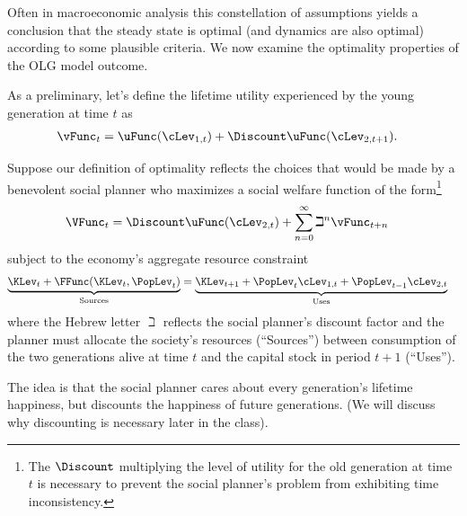 \documentclass{handout}
\begin{document}
Often in macroeconomic analysis this constellation of assumptions
yields a conclusion that the steady state is optimal (and dynamics are also optimal)
according to some plausible criteria.  We now examine the optimality
properties of the OLG model outcome.

As a preliminary, let's define the lifetime utility experienced 
by the young generation at time $t$ as
\begin{equation}\begin{gathered}\begin{aligned}
  \label{eq:lifeUtil}
  \vFunc_{t} & =  \uFunc(\cLev_{1,t})+\Discount \uFunc(\cLev_{2,t+1})
.
\end{aligned}\end{gathered}\end{equation}

Suppose our definition of optimality reflects the choices that would
be made by a benevolent social planner who maximizes a social
welfare function of the form\footnote{The $\Discount$ multiplying the level of utility for the old generation at time $t$ is necessary to prevent the social planner's problem from exhibiting time inconsistency.}
\begin{equation}\begin{gathered}\begin{aligned}
  \VFunc_{t} & =  \Discount \uFunc(\cLev_{2,t}) + \sum_{n=0}^{\infty} \beth^{n} \vFunc_{t+n}
\end{aligned}\end{gathered}\end{equation}
subject to the economy's aggregate resource constraint
\begin{equation}\begin{gathered}\begin{aligned}
  \label{eq:Bud}
  \underbrace{\KLev_{t} + \FFunc(\KLev_{t},\PopLev_{t})}_{\text{Sources}} & =  \underbrace{\KLev_{t+1} + \PopLev_{t} \cLev_{1,t} + \PopLev_{t-1} \cLev_{2,t}}_{\text{Uses}}
\end{aligned}\end{gathered}\end{equation}
where the Hebrew letter $\beth$ reflects the social planner's discount factor
and the planner must allocate the society's resources (``Sources'') between
consumption of the two generations alive at time $t$ and the capital stock
in period $t+1$ (``Uses'').  

The idea is that the social planner cares about every generation's lifetime happiness,
but discounts the happiness of future generations.  (We will discuss why discounting
is necessary later in the class).
\end{document}
